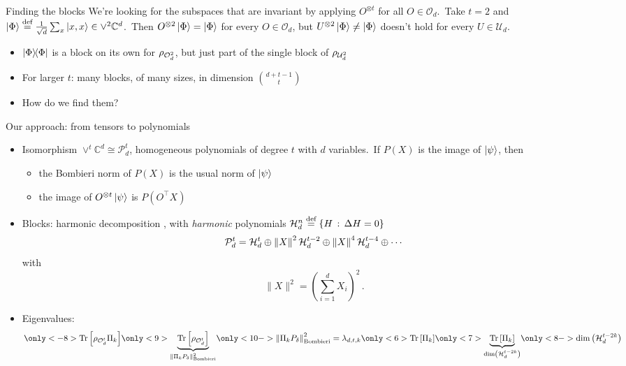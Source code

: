\documentclass[aspectratio=169]{beamer}
\newcommand{\scite}[1]{{\tiny\citep{#1}}}
\begin{document}
\begin{frame}{Finding the blocks}
    We're looking for the subspaces that are invariant by applying $O^{\otimes t}$ for all $O\in\mathcal{O}_d$.\pause\ Take $t=2$ and $\left|\Phi\right\rangle\mathrel{\overset{\text{def}}{=}}\frac{1}{\sqrt{d}}\sum_x\left|x, x\right\rangle\in\vee^2\mathbb{C}^d$.\pause\ Then \(O^{\otimes2}\left|\Phi\right\rangle=\left|\Phi\right\rangle\) for every $O\in\mathcal{O}_d$, but $U^{\otimes2}\left|\Phi\right\rangle\neq\left|\Phi\right\rangle$ doesn't hold for every $U\in\mathcal{U}_d$.\pause
	\begin{itemize}
		\item $\left|\Phi\middle\rangle\!\middle\langle\Phi\right|$ is a block on its own for $\rho_{\mathcal{O}_{d}^{2}}$, but just part of the single block of $\rho_{\mathcal{U}_{d}^{2}}$\pause
		\item For larger $t$: many blocks, of many sizes, in dimension $\binom{d+t-1}{t}$\pause
        \item How do we find them?
	\end{itemize}
\end{frame}

\begin{frame}{Our approach: from tensors to polynomials}
	\begin{itemize}\small
        \item Isomorphism $\vee^t\mathbb{C}^d\cong\mathcal{P}_d^t$, homogeneous polynomials of degree $t$ with $d$ variables.\pause\ If $P(X)$ is the image of $\left|\psi\right\rangle$, then\pause
            \begin{itemize}
                \item the Bombieri norm \scite{Bea+90} of $P(X)$ is the usual norm of $\left|\psi\right\rangle$\pause
                \item the image of $O^{\otimes t}\left|\psi\right\rangle$ is $P\left(O^\top X\right)$\pause
            \end{itemize}
		\item Blocks: harmonic decomposition \scite{CW68}, with \emph{harmonic} polynomials $\mathcal{H}_{d}^{n}\mathrel{\overset{\text{def}}{=}}\left\{H\,:\,\Delta H=0\right\}$
			\[\mathcal{P}_d^t=\mathcal{H}_{d}^{t}\oplus\left\|X\right\|^2\mathcal{H}_{d}^{t-2}\oplus\left\|X\right\|^4\mathcal{H}_{d}^{t-4}\oplus\cdots\]
            with
            \[\|X\|^2=\left(\sum_{i=1}^dX_i\right)^2\,.\]\pause
        \item Eigenvalues:
            \[\only<-8>{\tr{\rrrho{d}{t}\Pi_k}}\only<9>{\underbrace{\tr{\rrrho{d}{t}}}_{\left\lVert\Pi_kP_\delta\right\rVert_{\text{Bombieri}}^2}}\only<10->{\left\lVert\Pi_kP_\delta\right\rVert^2_{\text{Bombieri}}}=\lambda_{d, t, k}\only<6>{\tr{\Pi_k}}\only<7>{\underbrace{\tr{\Pi_k}}_{\dim\left(\mathcal{H}_d^{t-2k}\right)}}\only<8->{\dim\left(\mathcal{H}_d^{t-2k}\right)}\]
	\end{itemize}
    \vfill{}
\end{frame}
\end{document}
